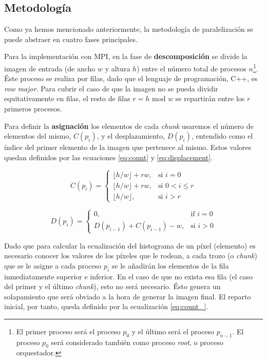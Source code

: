 \subsection{Metodología}

Como ya hemos mencionado anteriormente, la metodología de paralelización se puede abstraer en cuatro fases principales.

Para la implementación con MPI, en la fase de \textbf{descomposición} se divide la imagen de entrada (de ancho $w$ y altura $h$) entre el número total de procesos $n$\footnote{El primer proceso será el proceso $p_0$ y el último será el proceso $p_{n-1}$. El proceso $p_0$ será considerado también como proceso \textit{root}, o proceso orquestador.}. Éste proceso se realiza por filas, dado que el lenguaje de programación, C++, es \textit{row major}. Para cubrir el caso de que la imagen no se pueda dividir equitativamente en filas, el resto de filas $r = h \text{ mod } w$ se repartirán entre los $r$ primeros procesos.

Para definir la \textbf{asignación} los elementos de cada \textit{chunk} usaremos el número de elementos del mismo, $C(p_i)$, y el desplazamiento, $D(p_i)$, entendido como el índice del primer elemento de la imagen que pertenece al mismo.
Estos valores quedan definidos por las ecuaciones \ref{eq:count} y \ref{eq:displacement}.


\begin{equation}\label{eq:count}
  C(p_i) =
  \begin{cases}
    \lfloor h/w\rfloor + rw ,& \text{si } i = 0\\
    \lfloor h/w\rfloor + rw,& \text{si } 0 < i \le r\\
    \lfloor h/w\rfloor,& \text{si } i > r\
  \end{cases}
\end{equation}

\begin{equation}\label{eq:displacement}
  D(p_i) =
  \begin{cases}
    0,& \text{if } i = 0\\
    D(p_{i-1}) + C(p_{i-1}) - w,& \text{si } i > 0
  \end{cases}
\end{equation}


Dado que para calcular la ecualización del histograma de un píxel (elemento) es necesario conocer los valores de los píxeles que le rodean, a cada trozo (o \textit{chunk}) que se le asigne a cada proceso $p_i$ se le añadirán los elementos de la fila inmediatamente superior e inferior. En el caso de que no exista esa fila (el caso del primer y el último \textit{chunk}), esto no será necesario. Ésto genera un solapamiento que será obviado a la hora de generar la imagen final. El reparto inicial, por tanto, queda definido por la ecualización \ref{eq:count_}.

